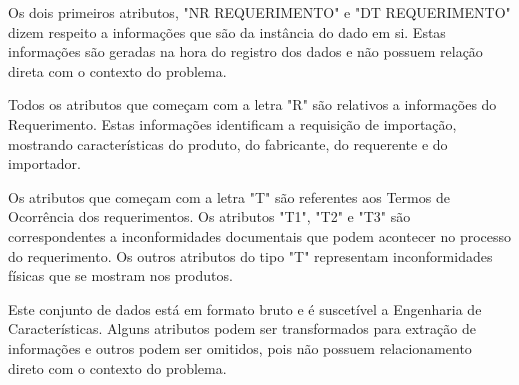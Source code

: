 Os dois primeiros atributos, "NR REQUERIMENTO" e "DT REQUERIMENTO" dizem respeito a informações que são da instância do dado em si. Estas informações são geradas na hora do registro dos dados e não possuem relação direta com o contexto do problema.

Todos os atributos que começam com a letra "R" são relativos a informações do Requerimento. Estas informações identificam a requisição de importação, mostrando características do produto, do fabricante, do requerente e do importador.

Os atributos que começam com a letra "T" são referentes aos Termos de Ocorrência dos requerimentos. Os atributos "T1", "T2" e "T3" são correspondentes a inconformidades documentais que podem acontecer no processo do requerimento. Os outros atributos do tipo "T" representam inconformidades físicas que se mostram nos produtos.

Este conjunto de dados está em formato bruto e é suscetível a Engenharia de Características. Alguns atributos podem ser transformados para extração de informações e outros podem ser omitidos, pois não possuem relacionamento direto com o contexto do problema. 

























